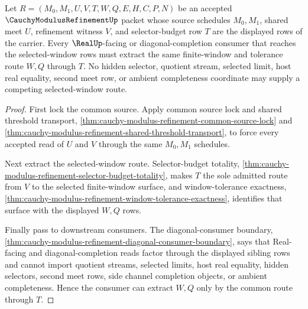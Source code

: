 \begin{theorem}
\label{thm:cauchy-modulus-refinement-common-window-selector-extraction}
Let $R=(M_0,M_1,U,V,T,W,Q,E,H,C,P,N)$ be an accepted $\CauchyModulusRefinementUp$ packet whose source schedules $M_0,M_1$, shared meet $U$, refinement witness $V$, and selector-budget row $T$ are the displayed rows of the carrier. Every $\RealUp$-facing or diagonal-completion consumer that reaches the selected-window rows must extract the same finite-window and tolerance route $W,Q$ through $T$. No hidden selector, quotient stream, selected limit, host real equality, second meet row, or ambient completeness coordinate may supply a competing selected-window route.
\end{theorem}
\begin{proof}
First lock the common source. Apply common source lock and shared threshold transport, \autoref{thm:cauchy-modulus-refinement-common-source-lock} and \autoref{thm:cauchy-modulus-refinement-shared-threshold-transport}, to force every accepted read of $U$ and $V$ through the same $M_0,M_1$ schedules.

Next extract the selected-window route. Selector-budget totality, \autoref{thm:cauchy-modulus-refinement-selector-budget-totality}, makes $T$ the sole admitted route from $V$ to the selected finite-window surface, and window-tolerance exactness, \autoref{thm:cauchy-modulus-refinement-window-tolerance-exactness}, identifies that surface with the displayed $W,Q$ rows.

Finally pass to downstream consumers. The diagonal-consumer boundary, \autoref{thm:cauchy-modulus-refinement-diagonal-consumer-boundary}, says that Real-facing and diagonal-completion reads factor through the displayed sibling rows and cannot import quotient streams, selected limits, host real equality, hidden selectors, second meet rows, side channel completion objects, or ambient completeness. Hence the consumer can extract $W,Q$ only by the common route through $T$.
\end{proof}

